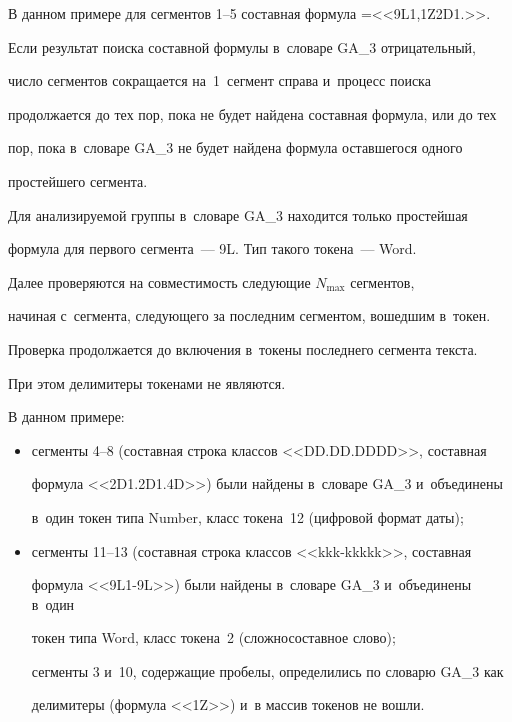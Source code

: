   


  В данном примере для сегментов 1--5 составная формула =\;<<{\sf 9L1,1Z2D1}.>>.


  


  Если результат поиска составной формулы в~словаре GA\_3 отрицательный, 


число сегментов сокращается на~1~сегмент справа и~процесс поиска 


продолжается до тех пор, пока не будет найдена составная формула, или до тех 


пор, пока в~словаре GA\_3 не будет найдена формула оставшегося одного 


простейшего сегмента.


  


  Для анализируемой группы в~словаре GA\_3 находится только простейшая 


формула для первого сегмента~--- 9L. Тип такого токена~--- Word.


  


  Далее проверяются на совместимость следующие $N_{\max}$  сегментов, 


начиная с~сегмента, следующего за последним сегментом, вошедшим в~токен. 


Проверка продолжается до включения в~токены последнего сегмента текста. 


При этом делимитеры токенами не являются.


  


  В данном примере:


  \begin{itemize}


\item[\,]  сегменты 4--8 (составная строка классов <<{\sf DD.DD.DDDD}>>, составная 


формула <<{\sf 2D1.2D1.4D}>>) были найдены в~словаре GA\_3 и~объединены 


в~один токен типа Number, класс токена~12 (цифровой формат даты);


  \item[\,]


  сегменты 11--13 (составная строка классов <<{\sf kkk-kkkkk}>>, составная 


формула <<{\sf 9L1-9L}>>) были найдены в~словаре GA\_3 и~объединены в~один 


токен типа Word, класс токена~2 (сложносоставное слово);


  


  сегменты 3 и~10, содержащие пробелы, определились по словарю GA\_3 как 


делимитеры (формула <<{\sf 1Z}>>) и~в массив токенов не вошли.


\end{itemize}





